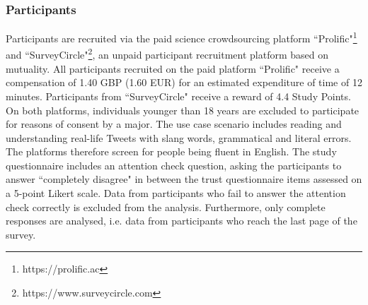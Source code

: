 \subsubsection{Participants}
Participants are recruited via the paid science crowdsourcing platform ``Prolific"\footnote{https://prolific.ac} and ``SurveyCircle"\footnote{https://www.surveycircle.com}, an unpaid participant recruitment platform based on mutuality. All participants recruited on the paid platform ``Prolific" receive a compensation of 1.40 GBP (1.60 EUR) for an estimated expenditure of time of 12 minutes. Participants from ``SurveyCircle" receive a reward of 4.4 Study Points. On both platforms, individuals younger than 18 years are excluded to participate for reasons of consent by a major. The use case scenario includes reading and understanding real-life Tweets with slang words, grammatical and literal errors. The platforms therefore screen for people being fluent in English. The study questionnaire includes an attention check question, asking the participants to answer ``completely disagree" in between the trust questionnaire items assessed on a 5-point Likert scale. Data from participants who fail to answer the attention check correctly is excluded from the analysis. Furthermore, only complete responses are analysed, i.e. data from participants who reach the last page of the survey.








